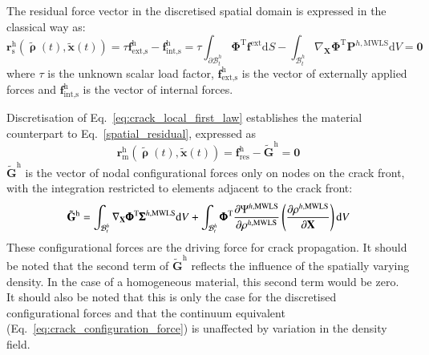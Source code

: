 \documentclass[review]{elsarticle}
\numberwithin{equation}{section}
\begin{document}

The residual force vector in the discretised spatial domain is expressed in the classical way as:
\begin{equation}
\label{spatial_residual}
	\mathbf{r}_\textrm{s}^\textrm{h}(\tilde{\pmb\uprho}(t), \tilde{\mathbf{x}}(t)) = \tau\mathbf{f}^\textrm{h}_\textrm{ext,s}-\mathbf{f}^\textrm{h}_\textrm{int,s}=\tau \int_{\partial\mathcal{B}^h_t} \pmb{\Phi}^\textrm{T}
	\mathbf{f}^\textrm{ext}
	\textrm{d}S-
	\int_{\mathcal{B}^h_t} \nabla_\mathbf{X} \pmb{\Phi}^\textrm{T}
	\mathbf{P}^{h,\textrm{MWLS}}\textrm{d}V=\mathbf{0}
\end{equation}
where $\tau$ is the unknown scalar load factor, $\mathbf{f}^\textrm{h}_\textrm{ext,s}$ is the vector of externally applied forces and $\mathbf{f}^\textrm{h}_\textrm{int,s}$ is the vector of internal forces. 

Discretisation of Eq.~\ref{eq:crack_local_first_law} establishes the material counterpart to Eq.~\ref{spatial_residual}, expressed as
\begin{equation}
\label{material_residual}
\mathbf{r}_\textrm{m}^\textrm{h}(\tilde{\pmb\uprho}(t), \tilde{\mathbf{x}}(t)) = \mathbf{f}^\textrm{h}_\textrm{res}-\tilde{\mathbf{G}}^\textrm{h}=\mathbf{0}
\end{equation}
$\tilde{\mathbf{G}}^\textrm{h}$ is the vector of nodal configurational forces only on nodes on the crack front, with the integration restricted to elements adjacent to the crack front:
\begin{equation}
	\tilde{\mathbf{G}}^\textrm{h} = 
	\int_{\mathcal{B}^h_t}
		\nabla_\mathbf{X}\pmb{\Phi}^\textrm{T} {\pmb\Sigma}^{h,\textrm{MWLS}}
	\textrm{d}V
	+
	\int_{\mathcal{B}^h_t}
		\pmb{\Phi}^\textrm{T} \dfrac{\partial {\Psi}^{h,\textrm{MWLS}} }{\partial \rho^{h,\rm{MWLS}}}
		\left(
			\frac{\partial 
			\rho^{h,\textrm{MWLS}}}{\partial \mathbf{X}}
		\right)
	\textrm{d}V
	\label{eq:mat_int_front}
\end{equation}
These configurational forces are the driving force for crack propagation. It should be noted that the second term of $\tilde{\mathbf{G}}^\textrm{h}$ reflects the influence of the spatially varying density. In the case of a homogeneous material, this second term would be zero. It should also be noted that this is only the case for the discretised configurational forces and that the continuum equivalent (Eq.~\ref{eq:crack_configuration_force}) is unaffected by variation in the density field.
\end{document}
